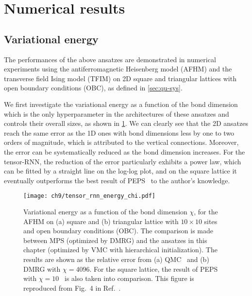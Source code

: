 \section{Numerical results}

\subsection{Variational energy}

The performances of the above ansatzes are demonstrated in numerical experiments using the antiferromagnetic Heisenberg model (AFHM) and the transverse field Ising model (TFIM) on 2D square and triangular lattices with open boundary conditions (OBC), as defined in \cref{sec:qu-sys}.

We first investigate the variational energy as a function of the bond dimension which is the only hyperparameter in the architectures of these ansatzes and controls their overall sizes, as shown in \cref{fig:tensor-rnn-energy-chi}. We can clearly see that the 2D ansatzes reach the same error as the 1D ones with bond dimensions less by one to two orders of magnitude, which is attributed to the vertical connections. Moreover, the error can be systematically reduced as the bond dimension increases. For the tensor-RNN, the reduction of the error particularly exhibits a power law, which can be fitted by a straight line on the log-log plot, and on the square lattice it eventually outperforms the best result of PEPS~\cite{liu2017gradient} to the author's knowledge.

\begin{figure}[htb]
\centering
\hspace*{-0.05\linewidth}
\texttt{[image: ch9/tensor\_rnn\_energy\_chi.pdf]}
\caption[Variational energy vs. bond dimension for tensor-RNN]{
Variational energy as a function of the bond dimension $\chi$, for the AFHM on (a) square and (b) triangular lattice with $10 \times 10$ sites and open boundary conditions (OBC). The comparison is made between MPS (optimized by DMRG) and the ansatzes in this chapter (optimized by VMC with hierarchical initialization). The results are shown as the relative error from (a) QMC~\cite{sandvik1997finite} and (b) DMRG with $\chi = 4096$. For the square lattice, the result of PEPS with $\chi = 10$~\cite{liu2017gradient} is also taken into comparison.
This figure is reproduced from Fig.~4 in Ref.~\cite{wu2023tensor}.
}
\label{fig:tensor-rnn-energy-chi}
\end{figure}

